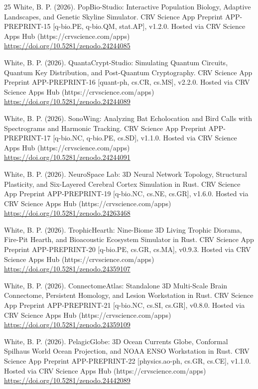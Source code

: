 \documentclass[10pt,letterpaper]{article}
\begin{document}
\begin{thebibliography}{25}
 White, B. P. (2026). PopBio-Studio: Interactive Population Biology, Adaptive Landscapes, and Genetic Skyline Simulator. CRV Science App Preprint APP-PREPRINT-15 [q-bio.PE, q-bio.QM, stat.AP], v1.2.0. Hosted via CRV Science Apps Hub (https://crvscience.com/apps) \url{https://doi.org/10.5281/zenodo.24244085}

 White, B. P. (2026). QuantaCrypt-Studio: Simulating Quantum Circuits, Quantum Key Distribution, and Post-Quantum Cryptography. CRV Science App Preprint APP-PREPRINT-16 [quant-ph, cs.CR, cs.MS], v2.2.0. Hosted via CRV Science Apps Hub (https://crvscience.com/apps) \url{https://doi.org/10.5281/zenodo.24244089}

 White, B. P. (2026). SonoWing: Analyzing Bat Echolocation and Bird Calls with Spectrograms and Harmonic Tracking. CRV Science App Preprint APP-PREPRINT-17 [q-bio.NC, q-bio.PE, cs.SD], v1.1.0. Hosted via CRV Science Apps Hub (https://crvscience.com/apps) \url{https://doi.org/10.5281/zenodo.24244091}

 White, B. P. (2026). NeuroSpace Lab: 3D Neural Network Topology, Structural Plasticity, and Six-Layered Cerebral Cortex Simulation in Rust. CRV Science App Preprint APP-PREPRINT-19 [q-bio.NC, cs.NE, cs.GR], v1.6.0. Hosted via CRV Science Apps Hub (https://crvscience.com/apps) \url{https://doi.org/10.5281/zenodo.24263468}

 White, B. P. (2026). TrophicHearth: Nine-Biome 3D Living Trophic Diorama, Fire-Pit Hearth, and Bioacoustic Ecosystem Simulator in Rust. CRV Science App Preprint APP-PREPRINT-20 [q-bio.PE, cs.GR, cs.MA], v0.9.3. Hosted via CRV Science Apps Hub (https://crvscience.com/apps) \url{https://doi.org/10.5281/zenodo.24359107}

 White, B. P. (2026). ConnectomeAtlas: Standalone 3D Multi-Scale Brain Connectome, Persistent Homology, and Lesion Workstation in Rust. CRV Science App Preprint APP-PREPRINT-21 [q-bio.NC, cs.SI, cs.GR], v0.8.0. Hosted via CRV Science Apps Hub (https://crvscience.com/apps) \url{https://doi.org/10.5281/zenodo.24359109}

 White, B. P. (2026). PelagicGlobe: 3D Ocean Currents Globe, Conformal Spilhaus World Ocean Projection, and NOAA ENSO Workstation in Rust. CRV Science App Preprint APP-PREPRINT-22 [physics.ao-ph, cs.GR, cs.CE], v1.1.0. Hosted via CRV Science Apps Hub (https://crvscience.com/apps) \url{https://doi.org/10.5281/zenodo.24442089}


\end{thebibliography}
\end{document}
